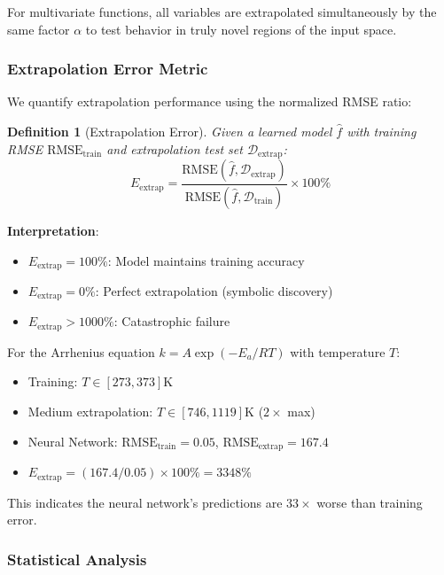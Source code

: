 \documentclass[twoside,11pt]{article}
\newtheorem{definition}{Definition}
\begin{document}
For multivariate functions, all variables are extrapolated simultaneously by the same factor $\alpha$ to test behavior in truly novel regions of the input space.

\subsubsection{Extrapolation Error Metric}

We quantify extrapolation performance using the normalized RMSE ratio:

\begin{definition}[Extrapolation Error]
\label{def:extrap_error}
Given a learned model $\hat{f}$ with training RMSE $\text{RMSE}_{\text{train}}$ and extrapolation test set $\mathcal{D}_{\text{extrap}}$:
\begin{equation}
E_{\text{extrap}} = \frac{\text{RMSE}(\hat{f}, \mathcal{D}_{\text{extrap}})}{\text{RMSE}(\hat{f}, \mathcal{D}_{\text{train}})} \times 100\%
\end{equation}
\end{definition}

\textbf{Interpretation}:
\begin{itemize}
    \item $E_{\text{extrap}} = 100\%$: Model maintains training accuracy
    \item $E_{\text{extrap}} = 0\%$: Perfect extrapolation (symbolic discovery)
    \item $E_{\text{extrap}} > 1000\%$: Catastrophic failure
\end{itemize}

\begin{example}
For the Arrhenius equation $k = A \exp(-E_a/RT)$ with temperature $T$:
\begin{itemize}
    \item Training: $T \in [273, 373]$K
    \item Medium extrapolation: $T \in [746, 1119]$K ($2\times$ max)
    \item Neural Network: $\text{RMSE}_{\text{train}} = 0.05$, $\text{RMSE}_{\text{extrap}} = 167.4$
    \item $E_{\text{extrap}} = (167.4 / 0.05) \times 100\% = 3348\%$
\end{itemize}
This indicates the neural network's predictions are $33\times$ worse than training error.
\end{example}

\subsubsection{Statistical Analysis}
\end{document}
